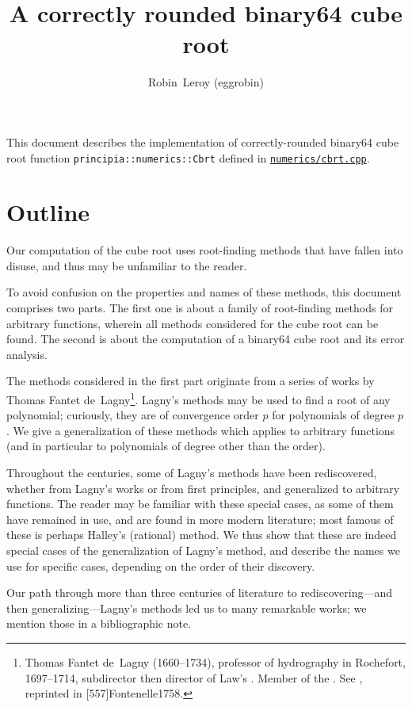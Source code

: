 ﻿\documentclass[10pt, a4paper, twoside]{basestyle}
\title{A correctly rounded binary64 cube root}
\date{\printdate{2021-06-21}}
\author{Robin~Leroy (eggrobin)}
\begin{document}
\maketitle
\noindent
This document describes the implementation of correctly-rounded binary64 cube root function {\texttt{principia::numerics::Cbrt}}
defined in \href{https://github.com/mockingbirdnest/Principia/blob/master/numerics/cbrt.cpp}{\texttt{numerics/cbrt.cpp}}.

\part*{Outline}

Our computation of the cube root uses root-finding methods that have fallen into disuse, and thus may be unfamiliar to the reader.

\cbstart{}To avoid\cbend{} confusion on the properties and names of these methods, this document comprises two parts.
The first one is about a family of root-finding methods for arbitrary functions, wherein all methods
considered for the cube root can be found. The second is about the computation of a binary64 cube root and its error
analysis.

The methods considered in the first part originate from a series of works by Thomas Fantet de~Lagny\footnote{Thomas Fantet de~Lagny (1660--1734), professor
of hydrography in Rochefort, 1697--1714, subdirector then director of Law's .
Member of the . See \cite{Fontenelle1734}, reprinted in [557\psqq]{Fontenelle1758}.}. Lagny's methods
may be used to find a root of any polynomial; curiously, they are of convergence order $p$ for polynomials of degree $p$.
We give a generalization of these methods which applies to arbitrary functions (and in particular to polynomials
of degree other than the order).

Throughout the centuries, some of Lagny's methods have been rediscovered, whether from Lagny's works or from first principles,
and generalized to arbitrary functions. The reader may be familiar with these special cases, as some of them have remained in
use, and are found in more modern literature; most famous of these is perhaps Halley's (rational) method. We thus show that
these are indeed special cases of the generalization of Lagny's method, and describe the names we use for specific cases,
depending on the order of their discovery.

Our path through more than three centuries of literature to rediscovering---and then generalizing---Lagny's methods led us to
many remarkable works; we mention those in a bibliographic note.
\end{document}
